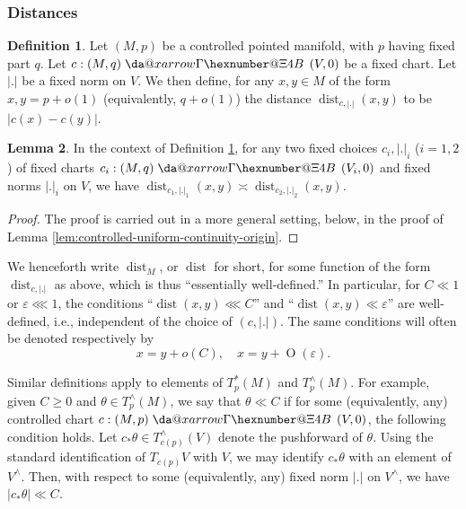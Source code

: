 \documentclass[reqno]{amsart}
\makeatletter
\newcommand*{\da@rightarrow}{\mathchar"0\hexnumber@\symAMSa 4B }
\newcommand*{\xdashrightarrow}[2][]{%
  \mathrel{%
    \mathpalette{\da@xarrow{#1}{#2}{}\da@rightarrow{\,}{}}{}%
  }%
}
\newcommand*{\da@xarrow}[7]{%
  \sbox0{$\ifx#7\scriptstyle\scriptscriptstyle\else\scriptstyle\fi#5#1#6\m@th$}%
  \sbox2{$\ifx#7\scriptstyle\scriptscriptstyle\else\scriptstyle\fi#5#2#6\m@th$}%
  \sbox4{$#7\dabar@\m@th$}%
  \dimen@=\wd0 %
  \ifdim\wd2 >\dimen@
    \dimen@=\wd2 %
  \fi
  \count@=2 %
  \def\da@bars{\dabar@\dabar@}%
  \@whiledim\count@\wd4<\dimen@\do{%
    \advance\count@\@ne
    \expandafter\def\expandafter\da@bars\expandafter{%
      \da@bars
      \dabar@ 
    }%
  }%
  \mathrel{#3}%
  \mathrel{%
    \mathop{\da@bars}\limits
    \ifx\\#1\\%
    \else
      _{\copy0}%
    \fi
    \ifx\\#2\\%
    \else
      ^{\copy2}%
    \fi
  }%
  \mathrel{#4}%
}
\def\eps{\varepsilon}
\DeclareMathOperator{\dist}{dist}
\def\O{\operatorname{O}}
\theoremstyle{plain} \newtheorem{theorem} {Theorem}
\theoremstyle{definition} \newtheorem{definition} [theorem] {Definition}
\theoremstyle{itplain} %
\newtheorem{lemma}[theorem]{Lemma}
\numberwithin{equation}{section}
\numberwithin{theorem}{section}
\renewcommand{\geq}{\geqslant}
\makeatother
\begin{document}
\subsubsection{Distances}\label{sec:distances}
\begin{definition}\label{defn:standard2:let-m-p-distances}
  Let $(M,p)$ be a controlled pointed manifold, with $p$ having fixed part $q$.  Let $c : (M,q) \xdashrightarrow{} (V,0)$ be a fixed chart.  Let $|.|$ be a fixed norm on $V$.  We then define, for any $x,y \in M$ of the form $x,y = p + o(1)$ (equivalently, $q + o(1)$) the distance $\dist_{c,|.|}(x,y)$ to be $|c(x) - c(y)|$.
\end{definition}
\begin{lemma}
 In the context of Definition \ref{defn:standard2:let-m-p-distances}, for any two fixed choices $c_i, |.|_i$ ($i=1,2$) of fixed charts $c_i : (M, q) \xdashrightarrow{} (V_i,0)$ and fixed norms $|.|_i$ on $V$, we have $\dist_{c_1,|.|_1}(x,y) \asymp \dist_{c_2,|.|_2}(x,y)$.
\end{lemma}
\begin{proof}
  The proof is carried out in a more general setting, below, in the proof of Lemma \ref{lem:controlled-uniform-continuity-origin}.
\end{proof}

We henceforth write $\dist_M$, or $\dist$ for short, for some function of the form $\dist_{c,|.|}$ as above, which is thus ``essentially well-defined.''  In particular, for $C \ll 1$ or $\eps \lll 1$, the conditions ``$\dist(x,y) \lll C$'' and ``$\dist(x,y) \ll \eps$'' are well-defined, i.e., independent of the choice of $(c,|.|)$.  The same conditions will often be denoted respectively by
\begin{equation*}
  x = y + o(C), \quad x = y + \O(\eps).
\end{equation*}

Similar definitions apply to elements of $T_p^*(M)$ and $T_p^\wedge(M)$.  For example, given $C \geq 0$ and $\theta \in T_p^\wedge(M)$, we say that $\theta \ll C$ if for some (equivalently, any) controlled chart $c : (M,p) \xdashrightarrow{} (V,0)$, the following condition holds.  Let $c_* \theta \in T_{c(p)}^\wedge(V)$ denote the pushforward of $\theta$.  Using the standard identification of $T_{c(p)} V$ with $V$, we may identify $c_* \theta$ with an element of $V^\wedge$.  Then, with respect to some (equivalently, any) fixed norm $|.|$ on $V^\wedge$, we have $|c_* \theta| \ll C$.
\end{document}

